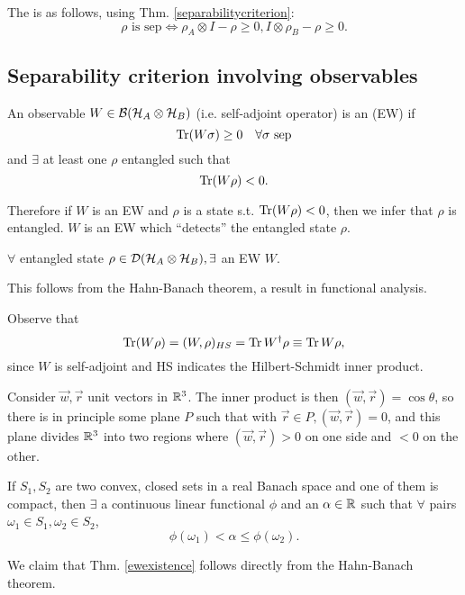 The  is as follows, using Thm. \ref{separabilitycriterion}:
\begin{equation}
    \rho\text{ is sep} \iff \rho_A\otimes I -\rho \geq 0, I\otimes \rho_B -\rho \geq 0.
\end{equation}

\subsection*{Separability criterion involving observables}
\begin{defn}
    An observable $W\in \mathcal{B}(\mathcal H_A\otimes \mathcal H_B)$ (i.e. self-adjoint operator) is an  (EW) if
    \begin{equation}
        \operatorname{Tr}(W\sigma) \geq 0 \quad\forall \sigma\text{ sep}
    \end{equation}
    and $\exists$ at least one $\rho$ entangled such that
    \begin{equation}
        \operatorname{Tr}(W\rho) <0.
    \end{equation}
\end{defn}
Therefore if $W$ is an EW and $\rho$ is a state s.t. $\operatorname{Tr}(W\rho)<0$, then we infer that $\rho$ is entangled. $W$ is an EW which ``detects'' the entangled state $\rho$.
\begin{thm}\label{ewexistence}
    $\forall$ entangled state $\rho\in \mathcal{D}(\mathcal H_A \otimes \mathcal H_B), \exists$ an EW $W$.
\end{thm}
This follows from the Hahn-Banach theorem, a result in functional analysis.

Observe that
\begin{equation}
    \operatorname{Tr}(W\rho) =(W,\rho)_{HS}=\operatorname{Tr} W^\dagger \rho \equiv \operatorname{Tr} W\rho,
\end{equation}
since $W$ is self-adjoint and HS indicates the Hilbert-Schmidt inner product.

Consider $\vec w,\vec r$ unit vectors in $\mathbb{R}^3$. The inner product is then $(\vec w,\vec r)=\cos\theta$, so there is in principle some plane $P$ such that with $\vec r\in P, (\vec w,\vec r)=0$, and this plane divides $\mathbb{R}^3$ into two regions where $(\vec w,\vec r)>0$ on one side and $<0$ on the other.

\begin{thm}
    If $S_1, S_2$ are two convex, closed sets in a real Banach space and one of them is compact, then $\exists$ a continuous linear functional $\phi$ and an $\alpha\in \mathbb{R}$ such that $\forall$ pairs $\omega_1 \in S_1,\omega_2\in S_2$,
    \begin{equation}
        \phi(\omega_1) < \alpha \leq \phi(\omega_2).
    \end{equation}
\end{thm}
We claim that Thm. \ref{ewexistence} follows directly from the Hahn-Banach theorem.

